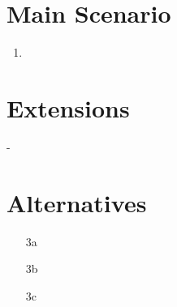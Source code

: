\documentclass[a4paper,11pt,oneside]{book}
\begin{document}
\section{Main Scenario}

\begin{enumerate}
\item 
\end{enumerate}

\section{Extensions}

-

\section{Alternatives}

\begin{enumerate}
  \item [3a]
  \item [3b]
  \item [3c]
\end{enumerate}

\fi
\end{document}
